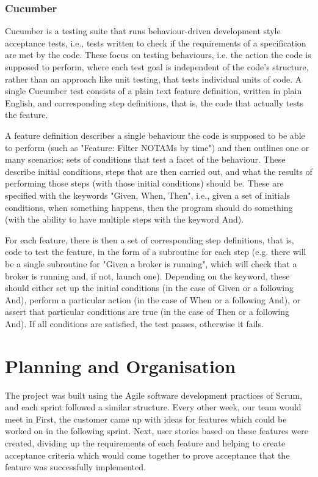 \documentclass[a4paper, 12pt]{article}
\begin{document}
\subsubsection{Cucumber}

Cucumber is a testing suite that runs behaviour-driven development style acceptance tests, i.e., tests written to check if the requirements of a specification are met by the code. These focus on testing behaviours, i.e. the action the code is supposed to perform, where each test goal is independent of the code’s structure, rather than an approach like unit testing, that tests individual units of code.
A single Cucumber test consists of a plain text feature definition, written in plain English, and corresponding step definitions, that is, the code that actually tests the feature. 

A feature definition describes a single behaviour the code is supposed to be able to perform (such as "Feature: Filter NOTAMs by time") and then outlines one or many scenarios: sets of conditions that test a facet of the behaviour. These describe initial conditions, steps that are then carried out, and what the results of performing those steps (with those initial conditions) should be. These are specified with the keywords "Given, When, Then", i.e., given a set of initials conditions, when something happens, then the program should do something (with the ability to have multiple steps with the keyword And). 

For each feature, there is then a set of corresponding step definitions, that is, code to test the feature, in the form of a subroutine for each step (e.g. there will be a single subroutine for "Given a broker is running", which will check that a broker is running and, if not, launch one). Depending on the keyword, these should either set up the initial conditions (in the case of Given or a following And), perform a particular action (in the case of When or a following And), or assert that particular conditions are true (in the case of Then or a following And). If all conditions are satisfied, the test passes, otherwise it fails.

\newpage

\section{Planning and Organisation}
\label{sec:planning}

The project was built using the Agile software development practices of Scrum, and each sprint followed a similar structure. Every other week, our team would meet in  First, the customer came up with ideas for features which could be worked on in the following sprint. Next, user stories based on these features were created, dividing up the requirements of each feature and helping to create acceptance criteria which would come together to prove acceptance that the feature was successfully implemented.
\end{document}
